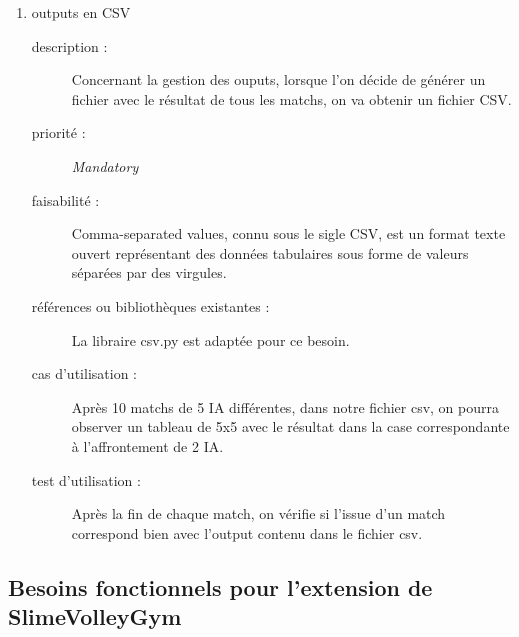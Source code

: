 \documentclass[11pt, a4paper]{article}
\newcommand{\besoinItem}[7]{
    \item #1
    \begin{description}
        \item[description :]
        #2 
        \item[priorité :]
        #3
        \item[faisabilité :]
        #4
        \item[références ou bibliothèques existantes :]
        #5
        \item[cas d'utilisation :]
        #6
        \item[test d'utilisation :]      
        #7 
    \end{description}
}
\begin{document}
\begin{enumerate}
\besoinItem{outputs en CSV}
{Concernant la gestion des ouputs, lorsque l'on décide de générer un fichier 
avec le résultat de tous les matchs, on va obtenir un fichier CSV.}
{\textit{Mandatory}}
{Comma-separated values, connu sous le sigle CSV, est un format texte ouvert
représentant des données tabulaires sous forme de valeurs séparées par des virgules.}
{La libraire csv.py\cite{csv.py} est adaptée pour ce besoin.}
{Après 10 matchs de 5 IA différentes, dans notre fichier csv, on pourra observer un tableau de 5x5 
avec le résultat dans la case correspondante à l'affrontement de 2 IA.}
{Après la fin de chaque match, on vérifie si l'issue d'un match correspond bien avec l'output contenu dans le fichier csv.}

\end{enumerate}

\subsection{Besoins fonctionnels pour l'extension de SlimeVolleyGym}
\end{document}
